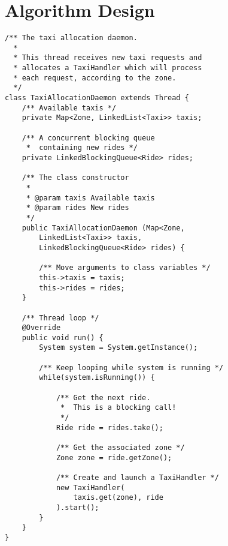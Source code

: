 \pagebreak
\section{Algorithm Design}

\lstset{language=Java,numbersep=10pt}
\begin{lstlisting}[frame=single]
/** The taxi allocation daemon. 
  *
  * This thread receives new taxi requests and 
  * allocates a TaxiHandler which will process 
  * each request, according to the zone.
  */
class TaxiAllocationDaemon extends Thread {
    /** Available taxis */
    private Map<Zone, LinkedList<Taxi>> taxis;

    /** A concurrent blocking queue 
     *  containing new rides */
    private LinkedBlockingQueue<Ride> rides;

    /** The class constructor
     *
     * @param taxis Available taxis
     * @param rides New rides
     */
    public TaxiAllocationDaemon (Map<Zone, 
        LinkedList<Taxi>> taxis, 
        LinkedBlockingQueue<Ride> rides) {

        /** Move arguments to class variables */
        this->taxis = taxis;
        this->rides = rides;
    }

    /** Thread loop */
    @Override
    public void run() {
        System system = System.getInstance();

        /** Keep looping while system is running */
        while(system.isRunning()) {

            /** Get the next ride. 
             *  This is a blocking call!
             */
            Ride ride = rides.take();

            /** Get the associated zone */
            Zone zone = ride.getZone();

            /** Create and launch a TaxiHandler */
            new TaxiHandler(
                taxis.get(zone), ride
            ).start(); 
        }
    }
}

\end{lstlisting}

